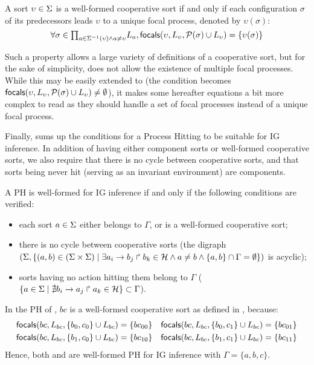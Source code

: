 \begin{property}\label{pro:wf-cooperative-sort}
A sort $\upsilon\in\Sigma$ is a well-formed cooperative sort if and only if
each configuration $\sigma$ of its predecessors leads $\upsilon$ to a unique focal process,
denoted by $\upsilon(\sigma)$:
\[
\forall \sigma \in {\textstyle\prod_{
a\in\Sigma^{-1}(\upsilon) \wedge a\neq \upsilon}}
L_{a},
\mathsf{focals}(\upsilon,L_\upsilon,\mathcal{P}(\sigma)\cup L_\upsilon) = \{ \upsilon(\sigma) \}\]
\end{property}

Such a property allows a large variety of definitions of a cooperative sort, but
for the sake of simplicity, does not allow the existence of multiple focal processes.
While this may be easily extended to (the condition becomes 
$\mathsf{focals}(\upsilon,L_\upsilon, \mathcal{P}(\sigma)\cup L_\upsilon)\neq\emptyset$), it makes some
hereafter equations a bit more complex to read as they should handle a set of focal processes instead
of a unique focal process.


Finally,  sums up the conditions for a Process Hitting to be suitable for IG
inference.
In addition of having either component sorts or well-formed cooperative sorts, we also require that
there is no cycle between cooperative sorts, and that
sorts being never hit (\ie serving as an invariant environment) are components.

\begin{property}\label{pro:wf-ph}
A PH is well-formed for IG inference if and only if the following conditions are verified:
\begin{itemize}
\item 
each sort $a\in\Sigma$ either belongs to $\Gamma$, or is a well-formed cooperative sort;
\item 
there is no cycle between cooperative sorts
(the digraph $(\Sigma,\{(a,b)\in(\Sigma\times\Sigma)\mid \exists a_i\rightarrow b_j\Rsh b_k\in\mathcal{H}
\wedge a\neq b\wedge \{a,b\}\cap\Gamma=\emptyset \})$ is
acyclic);
\item 
sorts having no action hitting them belong to $\Gamma$
($\{ a \in \Sigma\mid \nexists b_i\rightarrow a_j\Rsh a_k\in\mathcal{H}\} \subset \Gamma$).
\end{itemize}
\end{property}

\begin{example}
In the PH of , $bc$ is a well-formed cooperative sort as defined in , because:
\begin{align*}
\mathsf{focals}(bc, L_{bc}, \{b_0, c_0\} \cup L_{bc}) = \{bc_{00}\} && \mathsf{focals}(bc, L_{bc}, \{b_0, c_1\} \cup L_{bc}) = \{bc_{01}\} \\
\mathsf{focals}(bc, L_{bc}, \{b_1, c_0\} \cup L_{bc}) = \{bc_{10}\} && \mathsf{focals}(bc, L_{bc}, \{b_1, c_1\} \cup L_{bc}) = \{bc_{11}\}
\end{align*}
Hence, both  and  are well-formed PH for IG inference
with $\Gamma = \{a,b,c\}$.
\end{example}



